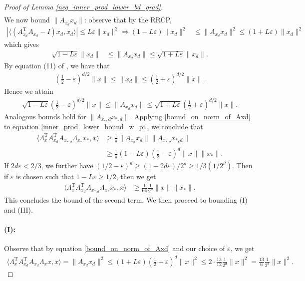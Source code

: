 \documentclass[11pt]{article}
\renewcommand{\epsilon}{\varepsilon}
\renewcommand{\top}{{\mathrm{T}}}
\theoremstyle{remark}
\begin{document}
\begin{proof}[Proof of Lemma \ref{neg_inner_prod_lower_bd_grad}]
\begin{align}
\end{align} We now bound $\|A_{x_d}x_d\|$: observe that by the RRCP, \begin{align}
|\langle (A_{x_d}^\top A_{x_d} - I)x_d,x_d\rangle| \leqslant L\epsilon\|x_d\|^2 \Longrightarrow 
(1-L\epsilon)\|x_d\|^2 & \leqslant \|A_{x_d}x_d\|^2 \leqslant (1 + L\epsilon)\|x_d\|^2 \nonumber
\end{align} which gives \begin{align}
\sqrt{1-L\epsilon}\|x_d\| & \leqslant \|A_{x_d}x_d\| \leqslant \sqrt{1 + L\epsilon}\|x_d\|. \nonumber
\end{align} By equation (11) of \cite{HV2017}, we have that \begin{align}
\left(\frac{1}{2}-\epsilon\right)^{d/2}\|x\| \leqslant \|x_d\| \leqslant \left(\frac{1}{2} + \epsilon\right)^{d/2}\|x\|. \nonumber
\end{align} Hence we attain \begin{align}
\sqrt{1 - L\epsilon}\left(\frac{1}{2} - \epsilon\right)^{d/2}\|x\| \leqslant \|A_{x_d}x_d\| \leqslant \sqrt{1 + L\epsilon}\left(\frac{1}{2} + \epsilon\right)^{d/2}\|x\|. \label{bound_on_norm_of_Axd}
\end{align} Analogous bounds hold for $\|A_{x_*,d}x_{*,d}\|$. Applying \eqref{bound_on_norm_of_Axd} to equation \eqref{inner_prod_lower_bound_w_pi}, we conclude that
\begin{align}
\langle \Lambda_x^\top A_{x_d}^\top A_{x_{*,d}}\Lambda_{x_*}x_*,x \rangle & \geqslant \frac{1}{\pi}\|A_{x_d}x_d\|\|A_{x_{*,d}}x_{*,d}\|  \nonumber \\
& \geqslant \frac{1}{\pi}(1-L\epsilon)\left(\frac{1}{2}-\epsilon\right)^d\|x\|\|x_*\|. \nonumber
\end{align} If $2d\epsilon < 2/3$, we further have $(1/2-\epsilon)^d \geqslant (1-2d\epsilon)/2^d\geqslant 1/3(1/2^d).$ Then if $\epsilon$ is chosen such that $1 - L\epsilon \geqslant 1/2$, then we get \begin{align}
\langle \Lambda_x^\top A_{x_d}^\top A_{x_{*,d}}\Lambda_{x_*}x_*,x \rangle & \geqslant \frac{1}{6\pi}\frac{1}{2^d}\|x\|\|x_*\|. \label{final_inner_prod_lower_bound}
\end{align} This concludes the bound of the second term. We then proceed to bounding (I) and (III).

\paragraph{(I):} Observe that by equation \eqref{bound_on_norm_of_Axd} and our choice of $\epsilon$, we get \begin{align}
\langle \Lambda_x^\top A_{x_d}^\top A_{x_d} \Lambda_x x,x \rangle = \|A_{x_d}x_d\|^2 \leqslant (1+L\epsilon)\left(\frac{1}{2}+\epsilon\right)^d\|x\|^2 \leqslant 2 \cdot\frac{13}{12}\frac{1}{2^d}\|x\|^2 = \frac{13}{6}\frac{1}{2^d}\|x\|^2. \nonumber
\end{align} 


\end{proof}
\end{document}
